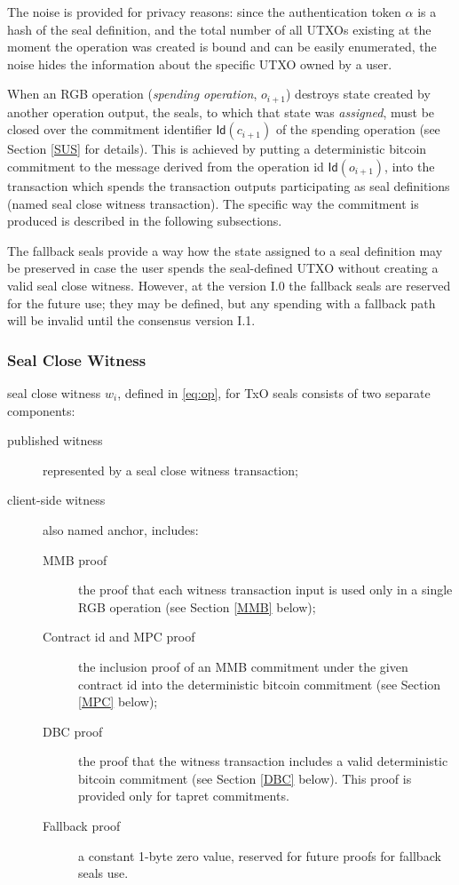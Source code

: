 \documentclass[9pt,oneside]{amsart}
\begin{document}
\begin{multicols}{2}
The noise is provided for privacy reasons:
since the \gls{authentication token} $\alpha$ is a hash of the seal definition,
and the total number of all UTXOs existing at the moment the operation was created is bound
and can be easily enumerated, the noise hides the information about the specific UTXO owned by a user.

When an RGB operation (\emph{spending operation}, $o_{i+1}$) destroys state
created by another operation output, the seals, to which that state was \emph{assigned},
must be closed over the commitment identifier $\mathsf{Id}(c_{i+1})$ of the spending operation
(see Section \ref{SUS} for details).
This is achieved by putting a deterministic bitcoin commitment to
the message derived from the operation id $\mathsf{Id}(o_{i+1})$,
into the transaction which spends the transaction outputs participating as seal definitions
(named \gls{seal close witness transaction}).
The specific way the commitment is produced is described in the following subsections.

The \glspl{fallback seal} provide a way how the state assigned to a seal definition
may be preserved in case the user spends the seal-defined UTXO without creating a valid \gls{seal close witness}.
However, at the version I.0 the \glspl{fallback seal} are reserved for the future use;
they may be defined, but any spending with a fallback path will be invalid
until the consensus version I.1.

\subsubsection{Seal Close Witness}\label{Witness}

\Gls{seal close witness} $w_i$, defined in \ref{eq:op}, for TxO seals consists of two
separate components:
\begin{description}
\item[\Gls{published witness}] represented by a \gls{seal close witness transaction};
\item[\Gls{client-side witness}] also named \gls{anchor},
    includes:
    \begin{description}
    \item[MMB proof] the proof that each witness transaction input
        is used only in a single RGB operation (see Section \ref{MMB} below);
    \item[Contract id and MPC proof] the inclusion proof of an MMB commitment
        under the given contract id into the deterministic bitcoin commitment
        (see Section \ref{MPC} below);
    \item[DBC proof] the proof that the witness transaction includes
        a valid deterministic bitcoin commitment (see Section \ref{DBC} below).
        This proof is provided only for tapret commitments.
    \item[Fallback proof] a constant 1-byte zero value,
        reserved for future proofs for \glspl{fallback seal} use.
    \end{description}
\end{description}



\end{multicols}
\end{document}
